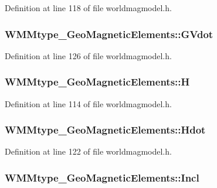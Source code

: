 Definition at line 118 of file worldmagmodel.\-h.

\hypertarget{struct_w_m_mtype___geo_magnetic_elements_abd5895b4add30e1d0a36e0b86ab9af22}{
\subsubsection[{G\-Vdot}]{ W\-M\-Mtype\-\_\-\-Geo\-Magnetic\-Elements\-::\-G\-Vdot}}\label{struct_w_m_mtype___geo_magnetic_elements_abd5895b4add30e1d0a36e0b86ab9af22}


Definition at line 126 of file worldmagmodel.\-h.

\hypertarget{struct_w_m_mtype___geo_magnetic_elements_a0481f463d3ac0e7d7638edd1293955ed}{
\subsubsection[{H}]{ W\-M\-Mtype\-\_\-\-Geo\-Magnetic\-Elements\-::\-H}}\label{struct_w_m_mtype___geo_magnetic_elements_a0481f463d3ac0e7d7638edd1293955ed}


Definition at line 114 of file worldmagmodel.\-h.

\hypertarget{struct_w_m_mtype___geo_magnetic_elements_a4f48837b7b954edff150a6994ff80720}{
\subsubsection[{Hdot}]{ W\-M\-Mtype\-\_\-\-Geo\-Magnetic\-Elements\-::\-Hdot}}\label{struct_w_m_mtype___geo_magnetic_elements_a4f48837b7b954edff150a6994ff80720}


Definition at line 122 of file worldmagmodel.\-h.

\hypertarget{struct_w_m_mtype___geo_magnetic_elements_a4a892ce94600018b364ef34e8416861c}{
\subsubsection[{Incl}]{ W\-M\-Mtype\-\_\-\-Geo\-Magnetic\-Elements\-::\-Incl}}\label{struct_w_m_mtype___geo_magnetic_elements_a4a892ce94600018b364ef34e8416861c}


